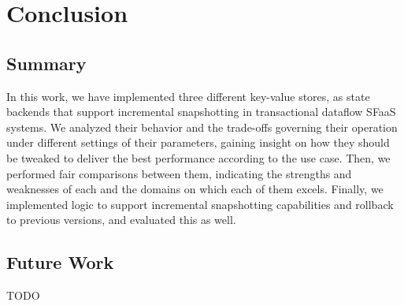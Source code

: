 
\chapter{Conclusion}

\label{Chapter5-conclusion}

\section{Summary}

In this work, we have implemented three different key-value stores, as state backends that support incremental snapshotting in transactional dataflow SFaaS systems.
We analyzed their behavior and the trade-offs governing their operation under different settings of their parameters, gaining insight on how they should be tweaked to deliver the best performance according to the use case.
Then, we performed fair comparisons between them, indicating the strengths and weaknesses of each and the domains on which each of them excels.
Finally, we implemented logic to support incremental snapshotting capabilities and rollback to previous versions, and evaluated this as well.

\section{Future Work}

TODO
